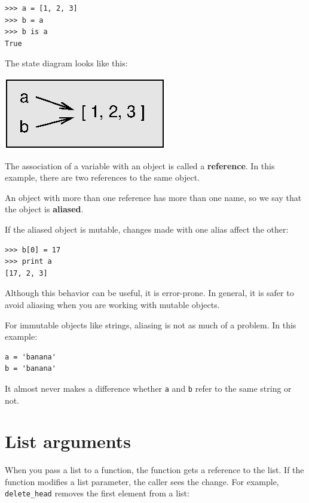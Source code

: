 \documentclass[10pt]{book}
\begin{document}
\beforeverb
\begin{verbatim}
>>> a = [1, 2, 3]
>>> b = a
>>> b is a
True
\end{verbatim}
\afterverb
%
The state diagram looks like this:


\beforefig
\centerline{\includegraphics{figs/list3.eps}}
\afterfig

The association of a variable with an object is called a {\bf
reference}.  In this example, there are two references to the same
object.


An object with more than one reference has more
than one name, so we say that the object is {\bf aliased}.


If the aliased object is mutable, 
changes made with one alias affect
the other:

\beforeverb
\begin{verbatim}
>>> b[0] = 17
>>> print a
[17, 2, 3]
\end{verbatim}
\afterverb
%
Although this behavior can be useful, it is error-prone.  In general,
it is safer to avoid aliasing when you are working with mutable
objects.


For immutable objects like strings, aliasing is not as much of a
problem.  In this example:

\beforeverb
\begin{verbatim}
a = 'banana'
b = 'banana'
\end{verbatim}
\afterverb
%
It almost never makes a difference whether {\tt a} and {\tt b} refer
to the same string or not.


\section{List arguments}


When you pass a list to a function, the function gets a reference
to the list.
If the function modifies a list parameter, the caller sees the change.
For example, \verb"delete_head" removes the first element from a list:
\end{document}
